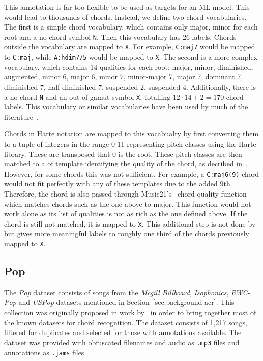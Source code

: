 This annotation is far too flexible to be used as targets for an ML model. This would lead to thousands of chords. Instead, we define two chord vocabularies. The first is a simple chord vocabulary, which contains only major, minor for each root and a no chord symbol \texttt{N}. Then this vocabulary has 26 labels. Chords outside the vocabulary are mapped to \texttt{X}. For example, \texttt{C:maj7} would be mapped to \texttt{C:maj}, while \texttt{A:hdim7/5} would be mapped to \texttt{X}. The second is a more complex vocabulary, which contains 14 qualities for each root: major, minor, diminished, augmented, minor 6, major 6, minor 7, minor-major 7, major 7, dominant 7, diminished 7, half diminished 7, suspended 2, suspended 4. Additionally, there is a no chord \texttt{N} and an out-of-gamut symbol \texttt{X}, totalling $12\cdot14 + 2 = 170$ chord labels. This vocabulary or similar vocabularies have been used by much of the literature~\citep{StructuredTraining,FourTimelyInsights,ACRLargeVocab1}.

Chords in Harte notation are mapped to this vocabualry by first converting them to a tuple of integers in the range 0-11 representing pitch classes using the Harte library. These are transposed that 0 is the root. These pitch classes are then matched to a of template identifying the quality of the chord, as decribed in~\citep{StructuredTraining}. However, for some chords this was not sufficient. For example, a \texttt{C:maj6(9)} chord would not fit perfectly with any of these templates due to the added 9th. Therefore, the chord is also passed through Music21's~\citep{music21} chord quality function which matches chords such as the one above to major. This function would not work alone as its list of qualities is not as rich as the one defined above. If the chord is still not matched, it is mapped to \texttt{X}. This additional step is not done by \citet{StructuredTraining} but gives more meaningful labels to roughly one third of the chords previously mapped to \texttt{X}.

\subsection{Pop}

The \emph{Pop} dataset consists of songs from the \emph{Mcgill Billboard}, \emph{Isophonics}, \emph{RWC-Pop} and \emph{USPop} datasets mentioned in Section~\ref{sec:background-acr}. This collection was originally proposed in work by~\citet{FourTimelyInsights} in order to bring together most of the known datasets for chord recognition. The dataset consists of 1,217 songs, filtered for duplicates and selected for those with annotations available. The dataset was provided with obfuscated filenames and audio as \texttt{.mp3} files and annotations as \texttt{.jams} files~\citep{JAMS}. 

